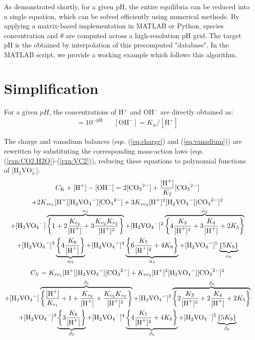 \documentclass[onecolumn,aps,prl,floatfix,superscriptaddress,longbibliography,showkeys,fleqn]{revtex4-2}
\begin{document}
As demonstrated shortly, for a given pH, the entire equilibria can be reduced into a single equation, which can be solved efficiently using numerical methods. By applying a matrix-based implementation in MATLAB or Python, species concentration and $\theta$ are computed across a high-resolution pH grid. The target pH is the obtained by interpolation of this precomputed "database". In the MATLAB script, we provide a working example which follows this algorithm.






\section{Simplification}

For a given $pH$, the concentrations of H$^+$ and OH$^-$ are directly obtained as:
\begin{align}
	[\mathrm{H^+}] = 10^{-\mathrm{pH}}			&	&		[\mathrm{OH^-}]=K_w/[\mathrm{H^+}]
\end{align}

The charge and vanadium balances (eqs. (\ref{eq:charge}) and (\ref{eq:vanadium})) are rewritten by substituting the corresponding mass-action laws (eqs. (\ref{rxn:CO2.H2O})-(\ref{rxn:VC2})), reducing these equations to polynomial functions of [H$_2$VO$_4^-$]:
\begin{multline}
	C_{\mathrm{K}} + [\ce{H+}] - [\ce{OH-}] = 2[\ce{CO3^2-}] + \frac{[\ce{H+}]}{K_2}[\ce{CO3^2-}] \\
	+ 2K_{vc_1}[\ce{H+}][\ce{H2VO4-}][\ce{CO3^2-}] + 3K_{vc_2}[\ce{H+}]^2[\ce{H2VO4-}][\ce{CO3^2-}]^2 \\
	+ [\ce{H2VO4-}]\overbrace{\left\{1+2\frac{K_{v_2}}{[\ce{H+}]}+3\frac{K_{v_2}K_{v_3}}{[\ce{H+}]^2}\right\}}^{\alpha_1} + [\ce{H2VO4-}]^2\overbrace{\left\{4\frac{K_3}{[\ce{H+}]^2} + 3\frac{K_4}{[\ce{H+}]} + 2K_5\right\}}^{\alpha_2} \\
	+ [\ce{H2VO4-}]^3 \underbrace{\left\{4\frac{K_6}{[\ce{H+}]}\right\}}_{\alpha_3} + [\ce{H2VO4-}]^4 \underbrace{\left\{ 6\frac{K_7}{[\ce{H+}]^2}+4K_8\right\}}_{\alpha_4} + [\ce{H2VO4-}]^5 \underbrace{\left\{5K_9\right\}}_{\alpha_5}						\label{eq:charge2}
\end{multline}
\begin{multline}
	C_{\mathrm{V}} = K_{vc_1}[\ce{H+}][\ce{H2VO4-}][\ce{CO3^2-}] + K_{vc_2}[\ce{H+}]^2[\ce{H2VO4-}][\ce{CO3^2-}]^2 \\
	+ [\ce{H2VO4-}] \overbrace{\left\{\frac{[\ce{H+}]}{K_{v_1}}+1+\frac{K_{v_2}}{[\ce{H+}]}+\frac{K_{v_2}K_{v_3}}{[\ce{H+}]^2}\right\}}^{\beta_1} + [\ce{H2VO4-}]^2\overbrace{\left\{2\frac{K_3}{[\ce{H+}]^2} + 2\frac{K_4}{[\ce{H+}]} + 2K_5\right\}}^{\beta_2} \\
	+ [\ce{H2VO4-}]^3 \underbrace{\left\{3\frac{K_6}{[\ce{H+}]}\right\}}_{\beta_3} + [\ce{H2VO4-}]^4 \underbrace{\left\{ 4\frac{K_7}{[\ce{H+}]^2}+4K_8\right\}}_{\beta_4} + [\ce{H2VO4-}]^5 \underbrace{\left\{5K_9\right\}}_{\beta_5}						\label{eq:vanadium2}
\end{multline}
\end{document}
